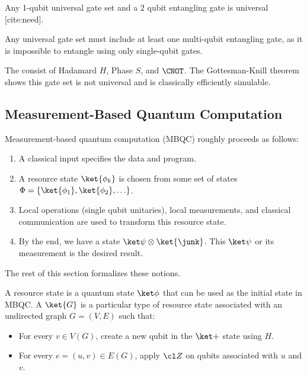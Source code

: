 \begin{fact}
\label{fact:1-qubit-and-entangling-universal}
Any 1-qubit universal gate set and a 2 qubit entangling gate is universal [cite:need].
\end{fact}

\begin{fact}
Any universal gate set must include at least one multi-qubit entangling gate, as it is impossible to entangle using only single-qubit gates.
\end{fact}

\begin{example}
The  consist of Hadamard $H$, Phase $S$, and $\CNOT$. The Gottesman-Knill theorem \cite{Gottesman-Knill} shows this gate set is not universal and is classically efficiently simulable.
\end{example}

\subsection{Measurement-Based Quantum Computation}

\begin{definition}
Measurement-based quantum computation (MBQC) roughly proceeds as follows:
\begin{enumerate}
    \item A classical input specifies the data and program.
    \item A resource state $\ket{\phi_k}$ is chosen from some set of states $\Phi = \{ \ket{\phi_1}, \ket{\phi_2}, \ldots \}$.
    \item Local operations (single qubit unitaries), local measurements, and classical communication are used to transform this resource state.
    \item By the end, we have a state $\ket\psi \otimes \ket{\junk}$. This $\ket\psi$ or its measurement is the desired result.
\end{enumerate}
The rest of this section formalizes these notions.
\end{definition}

\begin{definition}
A resource state is a quantum state $\ket\phi$ that can be used as the initial state in MBQC. A  $\ket{G}$ is a particular type of resource state associated with an undirected graph $G = (V,E)$ such that:
\begin{itemize}
    \item For every $v \in V(G)$, create a new qubit in the $\ket+$ state using $H$.
    \item For every $e = (u,v) \in E(G)$, apply $\cl Z$ on qubits associated with $u$ and $v$.
\end{itemize}
\end{definition}

